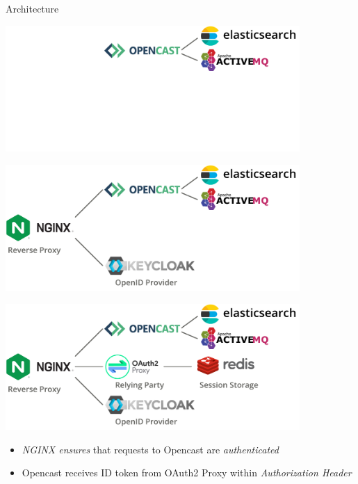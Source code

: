 \documentclass[aspectratio=169]{beamer}
\begin{document}
\begin{frame}{Architecture}
	\begin{overprint}
		\centerline{\includegraphics[width=0.84\textwidth]{figures/prototype-architecture-1}}
		\centerline{\includegraphics[width=0.84\textwidth]{figures/prototype-architecture-2}}
		\centerline{\includegraphics[width=0.84\textwidth]{figures/prototype-architecture-3}}
	\end{overprint}
	\begin{itemize}
		\item<4> \emph{NGINX ensures} that requests to Opencast are \emph{authenticated} \hfill {}
		\item<4> Opencast receives ID token from OAuth2 Proxy within \emph{Authorization Header}
	\end{itemize}
\end{frame}
\end{document}
